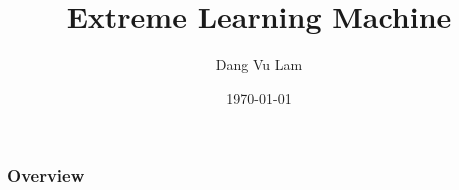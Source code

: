 \documentclass{beamer}
\title[Extreme Learning Machine]{Extreme Learning Machine} %
\author{Dang Vu Lam} %
\institute[USTH] %
{
University of Science and Technology of Hanoi\\ %
\medskip
\textit{lam.dv@live.com} %
}
\date{\today} %
\begin{document}
\begin{frame}
\titlepage %
\end{frame}

\begin{frame}
\frametitle{Overview} %
\tableofcontents %
\end{frame}


\end{document}
